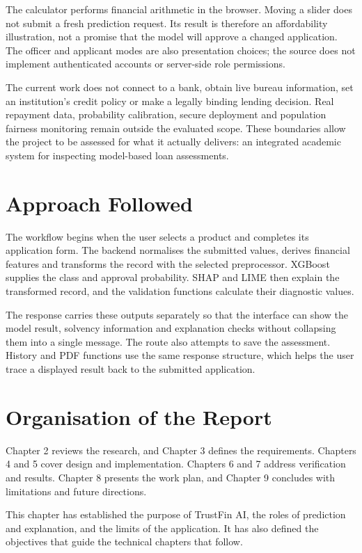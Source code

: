 The calculator performs financial arithmetic in the browser. Moving a slider does not submit a fresh prediction request. Its result is therefore an affordability illustration, not a promise that the model will approve a changed application. The officer and applicant modes are also presentation choices; the source does not implement authenticated accounts or server-side role permissions.

The current work does not connect to a bank, obtain live bureau information, set an institution's credit policy or make a legally binding lending decision. Real repayment data, probability calibration, secure deployment and population fairness monitoring remain outside the evaluated scope. These boundaries allow the project to be assessed for what it actually delivers: an integrated academic system for inspecting model-based loan assessments.

\section{Approach Followed}
The workflow begins when the user selects a product and completes its application form. The backend normalises the submitted values, derives financial features and transforms the record with the selected preprocessor. XGBoost supplies the class and approval probability. SHAP and LIME then explain the transformed record, and the validation functions calculate their diagnostic values.

The response carries these outputs separately so that the interface can show the model result, solvency information and explanation checks without collapsing them into a single message. The route also attempts to save the assessment. History and PDF functions use the same response structure, which helps the user trace a displayed result back to the submitted application.

\section{Organisation of the Report}
Chapter 2 reviews the research, and Chapter 3 defines the requirements. Chapters 4 and 5 cover design and implementation. Chapters 6 and 7 address verification and results. Chapter 8 presents the work plan, and Chapter 9 concludes with limitations and future directions.

\par\medskip\noindent
This chapter has established the purpose of TrustFin AI, the roles of prediction and explanation, and the limits of the application. It has also defined the objectives that guide the technical chapters that follow.

